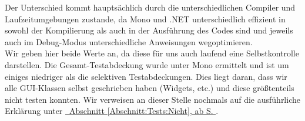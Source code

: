 Der Unterschied kommt hauptsächlich durch die unterschiedlichen Compiler und Laufzeitumgebungen zustande, da Mono und .NET unterschiedlich effizient in sowohl der
Kompilierung als auch in der Ausführung des Codes sind und jeweils auch im Debug-Modus unterschiedliche Anweisungen wegoptimieren.
~\\

Wir geben hier beide Werte an, da diese für uns auch laufend eine Selbstkontrolle darstellen.
Die Gesamt-Testabdeckung wurde unter Mono ermittelt und ist um einiges niedriger als die selektiven Testabdeckungen.
Dies liegt daran, dass wir alle GUI-Klassen selbst geschrieben haben (Widgets, etc.) und diese größtenteils nicht testen konnten.
Wir verweisen an dieser Stelle nochmals auf die ausführliche Erklärung unter \hyperref[Abschnitt:Tests:Nicht]{\mousecursor~Abschnitt \ref{Abschnitt:Tests:Nicht}, ab S. \pageref{Abschnitt:Tests:Nicht}}.



\thispagestyle{empty}
\pagestyle{empty}

\begin{figure}[h!]

   
\end{figure}


